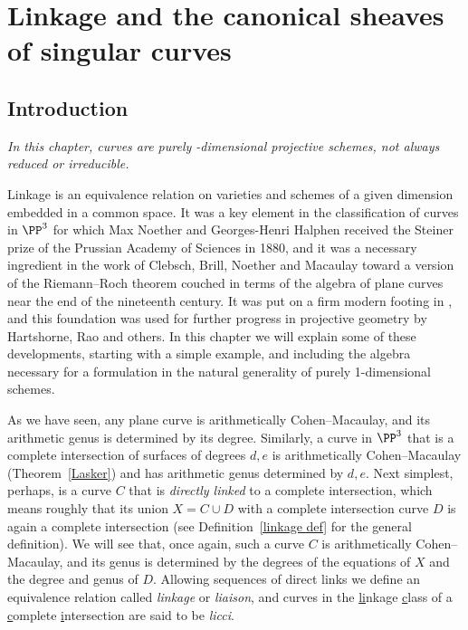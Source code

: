 
\chapter{Linkage and the canonical sheaves of singular curves}
\label{LiaisonChapter}\label{linkageChapter}\label{LinkageChapter}


\section{Introduction} \label{LinkageIntro}

\emph{In this chapter, curves are purely \1-dimensional projective
schemes, 
not always
reduced or irreducible.}

Linkage is an equivalence relation on varieties and schemes of a given
dimension embedded in a common space. It was a key element
in the classification of curves in $\PP^3$ for which
Max Noether and Georges-Henri Halphen
%
%
received the
Steiner prize
%
of the Prussian
Academy of Sciences in 1880, and it was a necessary ingredient in the
work of
Clebsch, Brill, Noether and Macaulay
toward
%
%
%
%
a version of the
Riemann--Roch theorem
couched in terms of the algebra
of plane curves near the end of the nineteenth century.
It was put on a firm modern footing in \cite{MR364271}, and this
%
%
%
%
%
foundation was used for further progress in projective geometry by
Hartshorne, Rao
and others. In this chapter we will explain some of
these developments, starting with a simple example,
%
and including the algebra necessary for a formulation in the natural
generality of purely 1-dimensional schemes.

As we have seen, any plane curve is
arithmetically Cohen--Macaulay,
%
and
its arithmetic genus is determined by its degree. Similarly, a curve in
$\PP^3$ that is a 
complete intersection
%
of surfaces of degrees $d,e$
is arithmetically Cohen--Macaulay (Theorem~\ref{Lasker}) and has
arithmetic genus determined by $d,e$.
Next simplest, perhaps,
%
is a curve $C$ that is
\emph{directly linked}
to a complete intersection,
which means roughly that its union $X = C\cup D$
with a complete intersection
curve $D$ is again a complete intersection
(see Definition~\ref{linkage def} for the general definition).
We will see that, once again, such a
curve $C$ is arithmetically Cohen--Macaulay,
and its genus is determined by the degrees of the equations of $X$
and the degree and genus of $D$.
Allowing sequences of direct links we define an equivalence relation
%
%
called  \emph{linkage} or \emph{liaison},
and curves in the \underline{li}nkage {\underline c}lass of a {\underline
c}omplete {\underline i}ntersection are
said to be
\emph{licci}.

